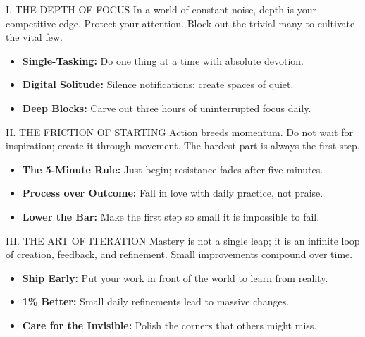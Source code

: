 \documentclass[12pt]{article}
\begin{document}
\noindent
\begin{minipage}[t]{0.48\textwidth}
  \begin{posterbox}{I. THE DEPTH OF FOCUS}
    In a world of constant noise, depth is your competitive edge. Protect your attention. Block out the trivial many to cultivate the vital few.
    \begin{itemize}
      \item \textbf{Single-Tasking:} Do one thing at a time with absolute devotion.
      \item \textbf{Digital Solitude:} Silence notifications; create spaces of quiet.
      \item \textbf{Deep Blocks:} Carve out three hours of uninterrupted focus daily.
    \end{itemize}
  \end{posterbox}
  
  \vspace{1.2cm}
  
  \begin{posterbox}{II. THE FRICTION OF STARTING}
    Action breeds momentum. Do not wait for inspiration; create it through movement. The hardest part is always the first step.
    \begin{itemize}
      \item \textbf{The 5-Minute Rule:} Just begin; resistance fades after five minutes.
      \item \textbf{Process over Outcome:} Fall in love with daily practice, not praise.
      \item \textbf{Lower the Bar:} Make the first step so small it is impossible to fail.
    \end{itemize}
  \end{posterbox}

  \vspace{1.2cm}

  \begin{posterbox}{III. THE ART OF ITERATION}
    Mastery is not a single leap; it is an infinite loop of creation, feedback, and refinement. Small improvements compound over time.
    \begin{itemize}
      \item \textbf{Ship Early:} Put your work in front of the world to learn from reality.
      \item \textbf{1\% Better:} Small daily refinements lead to massive changes.
      \item \textbf{Care for the Invisible:} Polish the corners that others might miss.
    \end{itemize}
  \end{posterbox}
\end{minipage}
\end{document}
